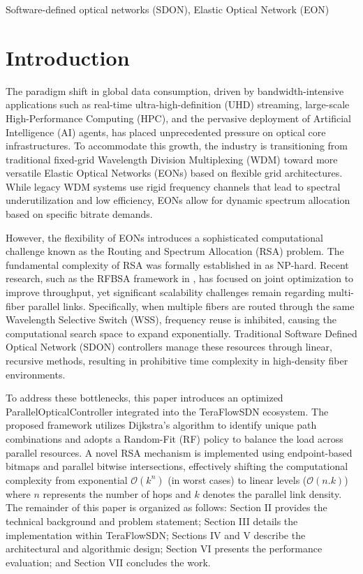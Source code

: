 \documentclass[conference]{IEEEtran}
\begin{document}
\begin{IEEEkeywords}
    Software-defined optical networks (SDON), Elastic Optical Network (EON)
\end{IEEEkeywords}

\section{Introduction} %
The paradigm shift in global data consumption, driven by bandwidth-intensive applications such as real-time ultra-high-definition (UHD) streaming, large-scale High-Performance Computing (HPC), and the pervasive deployment of Artificial Intelligence (AI) agents, has placed unprecedented pressure on optical core infrastructures. To accommodate this growth, the industry is transitioning from traditional fixed-grid Wavelength Division Multiplexing (WDM) toward more versatile Elastic Optical Networks (EONs) based on flexible grid architectures. While legacy WDM systems use rigid frequency channels that lead to spectral underutilization and low efficiency, EONs allow for dynamic spectrum allocation based on specific bitrate demands.

However, the flexibility of EONs introduces a sophisticated computational challenge known as the Routing and Spectrum Allocation (RSA) problem. The fundamental complexity of RSA was formally established in \cite{wuDynamicRouting} as NP-hard. Recent research, such as the RFBSA framework in \cite{wuRFBSA}, has focused on joint optimization to improve throughput, yet significant scalability challenges remain regarding multi-fiber parallel links. Specifically, when multiple fibers are routed through the same Wavelength Selective Switch (WSS), frequency reuse is inhibited, causing the computational search space to expand exponentially. Traditional Software Defined Optical Network (SDON) controllers manage these resources through linear, recursive methods, resulting in prohibitive time complexity in high-density fiber environments.

To address these bottlenecks, this paper introduces an optimized ParallelOpticalController integrated into the TeraFlowSDN ecosystem. The proposed framework utilizes Dijkstra's algorithm to identify unique path combinations and adopts a Random-Fit (RF) policy to balance the load across parallel resources. A novel RSA mechanism is implemented using endpoint-based bitmaps and parallel bitwise intersections, effectively shifting the computational complexity from exponential $\mathcal{O}(k^n)$ (in worst cases) to linear levels ($\mathcal{O}(n.k)$) where $n$ represents the number of hops and $k$ denotes the parallel link density. The remainder of this paper is organized as follows: Section II provides the technical background and problem statement; Section III details the implementation within TeraFlowSDN; Sections IV and V describe the architectural and algorithmic design; Section VI presents the performance evaluation; and Section VII concludes the work.
\end{document}
